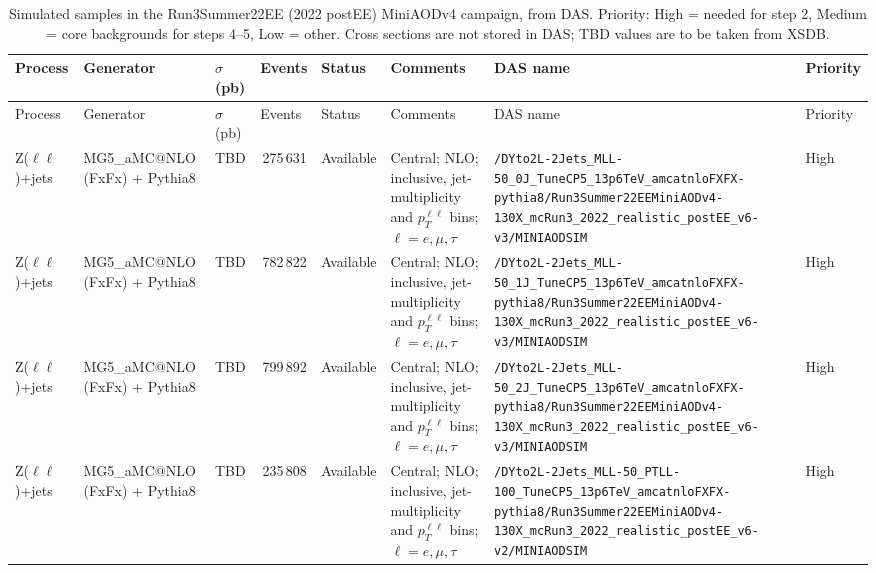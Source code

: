 \begin{landscape}
\begin{longtable}{@{}>{\raggedright\arraybackslash}p{2.6cm}>{\raggedright\arraybackslash}p{2.5cm}>{\raggedright\arraybackslash}p{0.9cm}>{\raggedleft\arraybackslash}p{1.6cm}>{\raggedright\arraybackslash}p{1.4cm}>{\raggedright\arraybackslash}p{3.6cm}>{\raggedright\arraybackslash}p{8.7cm}>{\raggedright\arraybackslash}p{1.2cm}@{}}
    \caption{Simulated samples in the Run3Summer22EE (2022 postEE) MiniAODv4 campaign, from DAS. Priority: High = needed for step 2, Medium = core backgrounds for steps 4--5, Low = other. Cross sections are not stored in DAS; TBD values are to be taken from XSDB.\label{tab:samples-das}} \\
    \toprule
    Process & Generator & $\sigma$ (pb) & Events & Status & Comments & DAS name & Priority \\
    \midrule
    \endfirsthead
    \toprule
    Process & Generator & $\sigma$ (pb) & Events & Status & Comments & DAS name & Priority \\
    \midrule
    \endhead
    \bottomrule
    \endlastfoot
Z($\ell\ell$)+jets & MG5\_aMC@NLO (FxFx) + Pythia8 & TBD & 346\,275\,631 & Available & Central; NLO; inclusive, jet-multiplicity and $p_T^{\ell\ell}$ bins; $\ell=e,\mu,\tau$ & \nolinkurl{/DYto2L-2Jets_MLL-50_0J_TuneCP5_13p6TeV_amcatnloFXFX-pythia8/Run3Summer22EEMiniAODv4-130X_mcRun3_2022_realistic_postEE_v6-v3/MINIAODSIM} & High \\
Z($\ell\ell$)+jets & MG5\_aMC@NLO (FxFx) + Pythia8 & TBD & 341\,782\,822 & Available & Central; NLO; inclusive, jet-multiplicity and $p_T^{\ell\ell}$ bins; $\ell=e,\mu,\tau$ & \nolinkurl{/DYto2L-2Jets_MLL-50_1J_TuneCP5_13p6TeV_amcatnloFXFX-pythia8/Run3Summer22EEMiniAODv4-130X_mcRun3_2022_realistic_postEE_v6-v3/MINIAODSIM} & High \\
Z($\ell\ell$)+jets & MG5\_aMC@NLO (FxFx) + Pythia8 & TBD & 280\,799\,892 & Available & Central; NLO; inclusive, jet-multiplicity and $p_T^{\ell\ell}$ bins; $\ell=e,\mu,\tau$ & \nolinkurl{/DYto2L-2Jets_MLL-50_2J_TuneCP5_13p6TeV_amcatnloFXFX-pythia8/Run3Summer22EEMiniAODv4-130X_mcRun3_2022_realistic_postEE_v6-v3/MINIAODSIM} & High \\
Z($\ell\ell$)+jets & MG5\_aMC@NLO (FxFx) + Pythia8 & TBD & 160\,235\,808 & Available & Central; NLO; inclusive, jet-multiplicity and $p_T^{\ell\ell}$ bins; $\ell=e,\mu,\tau$ & \nolinkurl{/DYto2L-2Jets_MLL-50_PTLL-100_TuneCP5_13p6TeV_amcatnloFXFX-pythia8/Run3Summer22EEMiniAODv4-130X_mcRun3_2022_realistic_postEE_v6-v2/MINIAODSIM} & High \\

\end{longtable}
\end{landscape}
